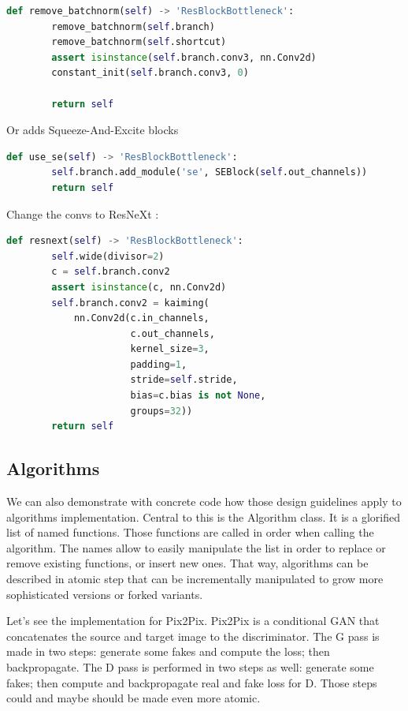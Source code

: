 \begin{lstlisting}[language=Python, caption=A ResBlock in Torchelie]
    def remove_batchnorm(self) -> 'ResBlockBottleneck':
        remove_batchnorm(self.branch)
        remove_batchnorm(self.shortcut)
        assert isinstance(self.branch.conv3, nn.Conv2d)
        constant_init(self.branch.conv3, 0)

        return self
\end{lstlisting}

Or adds Squeeze-And-Excite blocks \cite{squeezeexcitation}

\begin{lstlisting}[language=Python, caption=Add Squeeze-And-Excite module]
    def use_se(self) -> 'ResBlockBottleneck':
        self.branch.add_module('se', SEBlock(self.out_channels))
        return self
\end{lstlisting}

Change the convs to ResNeXt \cite{resnext}:

\begin{lstlisting}[language=Python, caption=ResNeXt]
    def resnext(self) -> 'ResBlockBottleneck':
        self.wide(divisor=2)
        c = self.branch.conv2
        assert isinstance(c, nn.Conv2d)
        self.branch.conv2 = kaiming(
            nn.Conv2d(c.in_channels,
                      c.out_channels,
                      kernel_size=3,
                      padding=1,
                      stride=self.stride,
                      bias=c.bias is not None,
                      groups=32))
        return self
\end{lstlisting}

\subsection{Algorithms}

We can also demonstrate with concrete code how those design guidelines apply to algorithms implementation. Central to this is the Algorithm class. It is a glorified list of named functions. Those functions are called in order when calling the algorithm. The names allow to easily manipulate the list in order to replace or remove existing functions, or insert new ones. That way, algorithms can be described in atomic step that can be incrementally manipulated to grow more sophisticated versions or forked variants.

Let's see the implementation for Pix2Pix. Pix2Pix is a conditional GAN that concatenates the source and target image to the discriminator. The G pass is made in two steps: generate some fakes and compute the loss; then backpropagate. The D pass is performed in two steps as well: generate some fakes; then compute and backpropagate real and fake loss for D. Those steps could and maybe should be made even more atomic.


